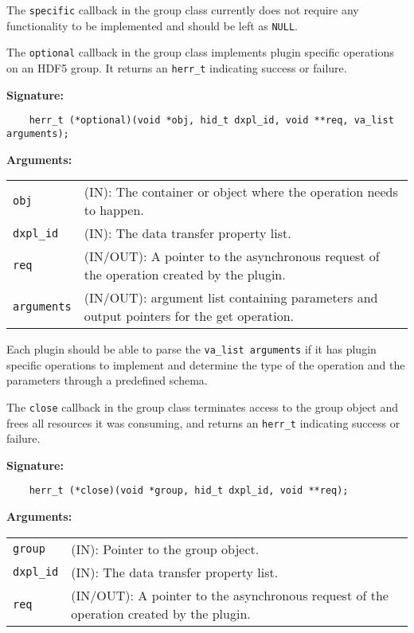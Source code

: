 The \texttt{specific} callback in the group class currently does not require any functionality to be implemented and should be left as \texttt{NULL}.

The \texttt{optional} callback in the group class implements plugin specific operations on an HDF5 group. It returns an \texttt{herr\_t} indicating success or failure. \bigskip

\begin{mdframed}[style=bgbox]
\textbf{Signature:}
\begin{lstlisting}
    herr_t (*optional)(void *obj, hid_t dxpl_id, void **req, va_list arguments);
\end{lstlisting}

\textbf{Arguments:}\\
\begin{tabular}{l p{10cm}}
  \texttt{obj} & (IN): The container or object where the operation needs to happen.\\
  \texttt{dxpl\_id} & (IN): The data transfer property list.\\
  \texttt{req} & (IN/OUT): A pointer to the asynchronous request of the operation created by the plugin.\\
  \texttt{arguments} & (IN/OUT): argument list containing parameters and output pointers for the get operation. \\
\end{tabular}
\end{mdframed}

Each plugin should be able to parse the \texttt{va\_list arguments} if it has plugin specific operations to implement and determine the type of the operation and the parameters through a predefined schema. 

The \texttt{close} callback in the group class terminates access to
the group object and frees all resources it was consuming, and returns
an \texttt{herr\_t} indicating success or failure.\bigskip

\begin{mdframed}[style=bgbox]
\textbf{Signature:}
\begin{lstlisting}
    herr_t (*close)(void *group, hid_t dxpl_id, void **req);
\end{lstlisting}

\textbf{Arguments:}\\
\begin{tabular}{l p{10cm}}
  \texttt{group} & (IN): Pointer to the group object.\\
  \texttt{dxpl\_id} & (IN): The data transfer property list.\\
  \texttt{req} & (IN/OUT): A pointer to the asynchronous request of the
  operation created by the plugin.\\
\end{tabular}
\end{mdframed}

